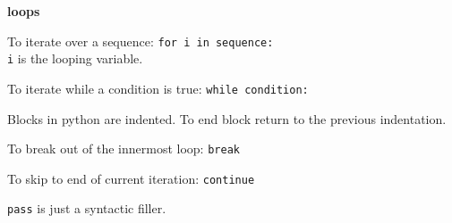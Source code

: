 \textbf{loops}

To iterate over a sequence: \lstinline|for i in sequence:|\\
\texttt{i} is the looping variable. 

To iterate while a condition is true: \lstinline|while condition:|

Blocks in python are indented. To end block return to the previous
indentation. 

To break out of the innermost loop: \lstinline|break|

To skip to end of current iteration: \lstinline|continue|

\lstinline|pass| is just a syntactic filler. 


